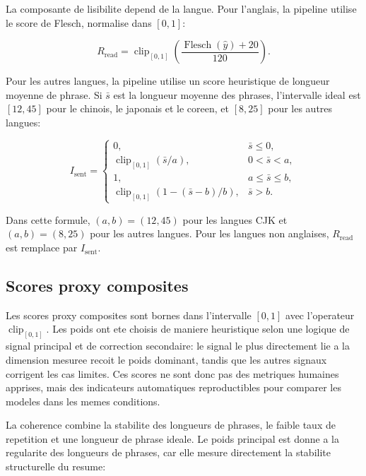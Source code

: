 La composante de lisibilite depend de la langue. Pour l'anglais, la pipeline utilise le score de Flesch, normalise dans $[0,1]$:

\begin{equation}
R_{\mathrm{read}} =
\operatorname{clip}_{[0,1]}\left(\frac{\operatorname{Flesch}(\hat{y}) + 20}{120}\right).
\label{eq:readability-component-en}
\end{equation}

Pour les autres langues, la pipeline utilise un score heuristique de longueur moyenne de phrase. Si $\bar{s}$ est la longueur moyenne des phrases, l'intervalle ideal est $[12,45]$ pour le chinois, le japonais et le coreen, et $[8,25]$ pour les autres langues:

\begin{equation}
I_{\mathrm{sent}} =
\begin{cases}
0, & \bar{s} \leq 0, \\
\operatorname{clip}_{[0,1]}(\bar{s}/a), & 0 < \bar{s} < a, \\
1, & a \leq \bar{s} \leq b, \\
\operatorname{clip}_{[0,1]}(1-(\bar{s}-b)/b), & \bar{s} > b.
\end{cases}
\label{eq:ideal-sentence-length}
\end{equation}

Dans cette formule, $(a,b)=(12,45)$ pour les langues CJK et $(a,b)=(8,25)$ pour les autres langues. Pour les langues non anglaises, $R_{\mathrm{read}}$ est remplace par $I_{\mathrm{sent}}$.

\subsection{Scores proxy composites}

Les scores proxy composites sont bornes dans l'intervalle $[0,1]$ avec l'operateur $\operatorname{clip}_{[0,1]}$. Les poids ont ete choisis de maniere heuristique selon une logique de signal principal et de correction secondaire: le signal le plus directement lie a la dimension mesuree recoit le poids dominant, tandis que les autres signaux corrigent les cas limites. Ces scores ne sont donc pas des metriques humaines apprises, mais des indicateurs automatiques reproductibles pour comparer les modeles dans les memes conditions.

La coherence combine la stabilite des longueurs de phrases, le faible taux de repetition et une longueur de phrase ideale. Le poids principal est donne a la regularite des longueurs de phrases, car elle mesure directement la stabilite structurelle du resume:


